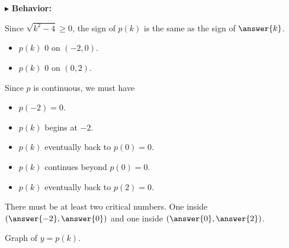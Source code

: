 \documentclass{ximera}
\begin{document}
$\blacktriangleright$ \textbf{\textcolor{blue!55!black}{Behavior:}}  



\begin{explanation}

Since $\sqrt{k^2 - 4} \geq 0$, the sign of $p(k)$ is the same as the sign of $\answer{k}$.

\begin{itemize}
\item  $p(k)$ \wordChoice{\choice[correct]{<} \choice{>}}  $0$ on $(-2, 0)$.
\item  $p(k)$ \wordChoice{\choice{<} \choice[correct]{>}}  $0$ on $(0, 2)$.
\end{itemize}


Since $p$ is continuous, we must have 


\begin{itemize}
\item  $p(-2) = 0$.
\item  $p(k)$ begins   at $-2$.
\item  $p(k)$ eventually   back to $p(0) = 0$.
\item  $p(k)$ continues   beyond $p(0) = 0$.
\item  $p(k)$ eventually   back to $p(2) = 0$.
\end{itemize}


There must be at least two critical numbers.  One inside $\left( \answer{-2}, \answer{0} \right)$ and one inside $\left( \answer{0}, \answer{2} \right)$.

\end{explanation}










Graph of $y = p(k)$.
\end{document}
